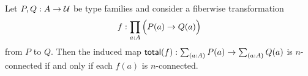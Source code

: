 \documentclass[hott-all.tex]{subfiles}
\begin{document}
% 
% 
% 
% 
% 
\begin{lem}
Let $P,Q:A\to\mathcal{U}$ be type families and consider a fiberwise transformation
\begin{equation*}
f:\prd{a:A} \Parens{P(a)\to Q(a)}
\end{equation*}
from $P$ to $Q$. Then the induced map $\total f: \sm{a:A}P(a) \to \sm{a:A} Q(a)$ is $n$-connected if and only if each $f(a)$ is $n$-connected.
\end{lem}
% 
% 
\end{document}
